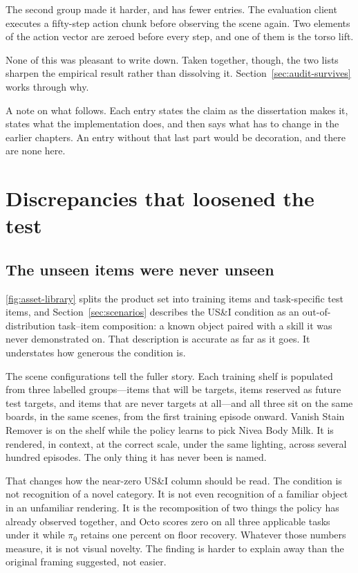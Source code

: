 The second group made it harder, and has fewer entries. The evaluation client executes a fifty-step action chunk before observing the scene again. Two elements of the action vector are zeroed before every step, and one of them is the torso lift.

None of this was pleasant to write down. Taken together, though, the two lists sharpen the empirical result rather than dissolving it. Section~\ref{sec:audit-survives} works through why.

A note on what follows. Each entry states the claim as the dissertation makes it, states what the implementation does, and then says what has to change in the earlier chapters. An entry without that last part would be decoration, and there are none here.

\section{Discrepancies that loosened the test}

\subsection*{The unseen items were never unseen}

\ref{fig:asset-library} splits the product set into training items and task-specific test items, and Section~\ref{sec:scenarios} describes the US\&I condition as an out-of-distribution task--item composition: a known object paired with a skill it was never demonstrated on. That description is accurate as far as it goes. It understates how generous the condition is.

The scene configurations tell the fuller story. Each training shelf is populated from three labelled groups---items that will be targets, items reserved as future test targets, and items that are never targets at all---and all three sit on the same boards, in the same scenes, from the first training episode onward. Vanish Stain Remover is on the shelf while the policy learns to pick Nivea Body Milk. It is rendered, in context, at the correct scale, under the same lighting, across several hundred episodes. The only thing it has never been is named.

That changes how the near-zero US\&I column should be read. The condition is not recognition of a novel category. It is not even recognition of a familiar object in an unfamiliar rendering. It is the recomposition of two things the policy has already observed together, and Octo scores zero on all three applicable tasks under it while $\pi_0$ retains one percent on floor recovery. Whatever those numbers measure, it is not visual novelty. The finding is harder to explain away than the original framing suggested, not easier.


